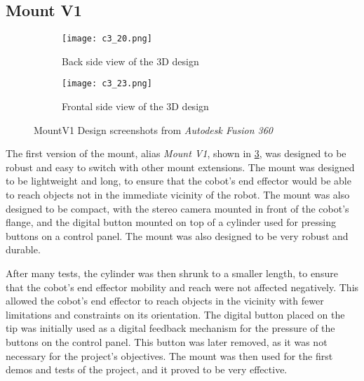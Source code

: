 \subsection{Mount V1}

\begin{figure}
    \centering
    \begin{subfigure}{\textwidth}
        \texttt{[image: c3\_20.png]} %
        \caption{Back side view of the 3D design}
        \label{fig:frontv1}
    \end{subfigure}
    
    \vspace{1em} %

    \begin{subfigure}{\textwidth}
        \texttt{[image: c3\_23.png]} %
        \caption{Frontal side view of the 3D design}
        \label{fig:sidev1}
    \end{subfigure}

    \caption{MountV1 Design screenshots from \textit{Autodesk Fusion 360}}
    \label{fig:mountv1}
\end{figure}

The first version of the mount, alias \textit{Mount V1}, shown in \ref{fig:mountv1},
was designed to be robust and easy to switch with other mount extensions. 
The mount was designed to be lightweight and long, to ensure that the cobot's end effector
would be able to reach objects not in the immediate vicinity of the robot. The mount was also designed to be
compact, with the stereo camera mounted in front of the cobot's flange, and the digital button mounted on top
of a cylinder used for pressing buttons on a control panel. The mount was also designed to be very robust and durable.

After many tests, the cylinder was then shrunk to a smaller length, to ensure that the cobot's end effector
mobility and reach were not affected negatively. This allowed the cobot's end effector to reach objects
in the vicinity with fewer limitations and constraints on its orientation.
The digital button placed on the tip was initially used as a digital feedback mechanism for the pressure
of the buttons on the control panel. This button was later removed, as it was not necessary for the project's
objectives. The mount was then used for the first demos and tests of the project, and it proved to be very effective.

